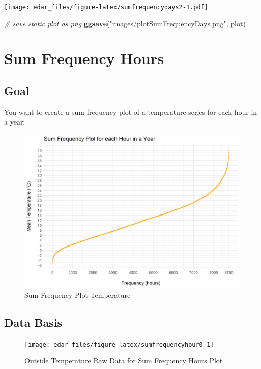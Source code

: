 \documentclass[
  a4paperpaper,
]{book}
\newenvironment{Shaded}{\begin{snugshade}}{\end{snugshade}}
\newcommand{\CommentTok}[1]{\textcolor[rgb]{0.56,0.35,0.01}{\textit{#1}}}
\newcommand{\KeywordTok}[1]{\textcolor[rgb]{0.13,0.29,0.53}{\textbf{#1}}}
\newcommand{\NormalTok}[1]{#1}
\newcommand{\StringTok}[1]{\textcolor[rgb]{0.31,0.60,0.02}{#1}}
\let\oldShaded\Shaded
\let\endoldShaded\endShaded
\renewenvironment{Shaded}{\footnotesize\oldShaded}{\endoldShaded}
\begin{document}
\texttt{[image: edar\_files/figure-latex/sumfrequencydays2-1.pdf]}

\begin{Shaded}
\begin{Highlighting}[]
\CommentTok{# save static plot as png}
\KeywordTok{ggsave}\NormalTok{(}\StringTok{"images/plotSumFrequencyDays.png"}\NormalTok{, plot)}
\end{Highlighting}
\end{Shaded}

\newpage

\hypertarget{sum-frequency-hours}{%
\section{Sum Frequency Hours}\label{sum-frequency-hours}}

\hypertarget{goal-17}{%
\subsection{Goal}\label{goal-17}}

You want to create a sum frequency plot of a temperature series for each hour in a year:

\begin{figure}
\includegraphics[width=0.7\linewidth]{images/plotSumFrequencyHour} \caption{Sum Frequency Plot Temperature}\label{fig:unnamed-chunk-27}
\end{figure}

\hypertarget{data-basis-17}{%
\subsection{Data Basis}\label{data-basis-17}}

\begin{figure}
\texttt{[image: edar\_files/figure-latex/sumfrequencyhour0-1]} \caption{Outside Temperature Raw Data for Sum Frequency Hours Plot}\label{fig:sumfrequencyhour0}
\end{figure}
\end{document}
